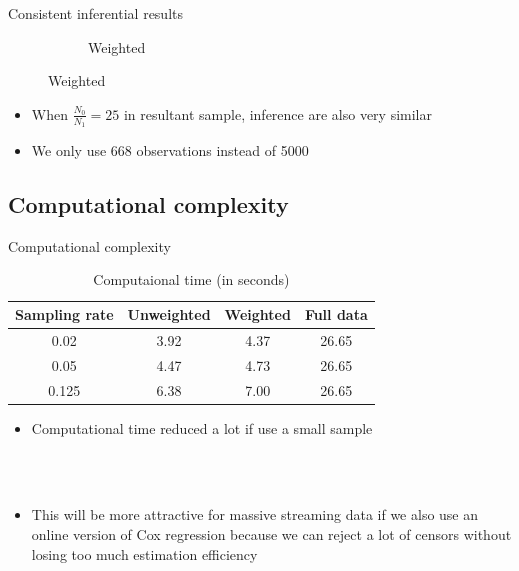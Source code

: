 \documentclass{beamer}
\newcommand{\red}{\color{red}}
\begin{document}
\begin{frame}{Consistent inferential results}
\begin{figure}
\begin{subfigure}{0.47\textwidth}
		\caption{Weighted}
	\end{subfigure}
	\label{fig:infer}
	\end{figure}
    \begin{itemize}
        \item When $\frac{N_0}{N_1}=25$ in resultant sample, inference are also very similar 
        \item We only use {\red 668} observations instead of {\red 5000}
    \end{itemize}
\end{frame}
\subsection{Computational complexity}
\begin{frame}{Computational complexity}
    \begin{table}[H]
    \caption{Computaional time (in seconds)}
    \label{tab:time}
    \begin{tabular}{cccc}\hline
    \multicolumn{1}{l}{Sampling rate} & Unweighted & Weighted & Full data \\\hline
    0.02                              & 3.92       & 4.37     & 26.65     \\
    0.05                              & 4.47       & 4.73     & 26.65     \\
    0.125                             & 6.38       & 7.00     & 26.65     \\\hline
    \end{tabular}
    \end{table}
    \begin{itemize}
        \item Computational time reduced a lot if use a small sample 
    \end{itemize}
    \hspace*{\fill}\\
    \hspace*{\fill}\\
    \begin{itemize}
        \item This will be more attractive for massive streaming data if we also use an online version of Cox regression because we can reject a lot of censors without losing too much estimation efficiency
    \end{itemize}
    \end{frame}
\end{document}
